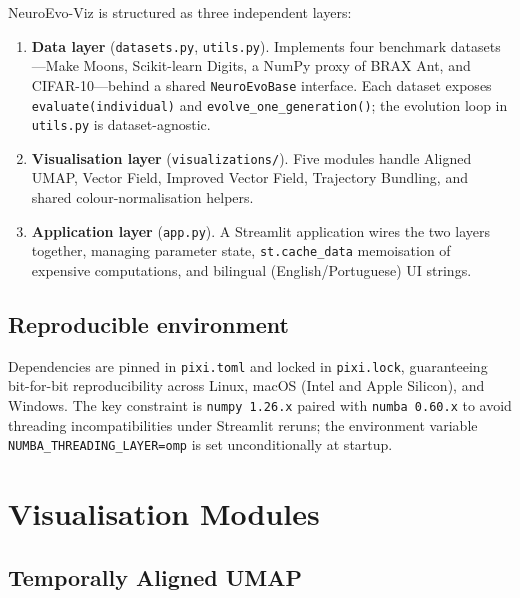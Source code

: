 \documentclass{article}
\begin{document}
NeuroEvo-Viz is structured as three independent layers:

\begin{enumerate}
  \item \textbf{Data layer} (\texttt{datasets.py}, \texttt{utils.py}).
        Implements four benchmark datasets---Make Moons, Scikit-learn Digits,
        a NumPy proxy of BRAX Ant, and CIFAR-10---behind a shared
        \texttt{NeuroEvoBase} interface.
        Each dataset exposes \texttt{evaluate(individual)} and
        \texttt{evolve\_one\_generation()}; the evolution loop in
        \texttt{utils.py} is dataset-agnostic.

  \item \textbf{Visualisation layer} (\texttt{visualizations/}).
        Five modules handle Aligned UMAP, Vector Field, Improved Vector Field,
        Trajectory Bundling, and shared colour-normalisation helpers.

  \item \textbf{Application layer} (\texttt{app.py}).
        A Streamlit application wires the two layers together, managing
        parameter state, \texttt{st.cache\_data} memoisation of expensive
        computations, and bilingual (English/Portuguese) UI strings.
\end{enumerate}

\subsection{Reproducible environment}

Dependencies are pinned in \texttt{pixi.toml} and locked in \texttt{pixi.lock},
guaranteeing bit-for-bit reproducibility across Linux, macOS (Intel and Apple
Silicon), and Windows.
The key constraint is \texttt{numpy~1.26.x} paired with \texttt{numba~0.60.x}
to avoid threading incompatibilities under Streamlit reruns; the environment
variable \texttt{NUMBA\_THREADING\_LAYER=omp} is set unconditionally at
startup.


\section{Visualisation Modules}
\label{sec:visualizations}

\subsection{Temporally Aligned UMAP}
\label{sec:align}
\end{document}
